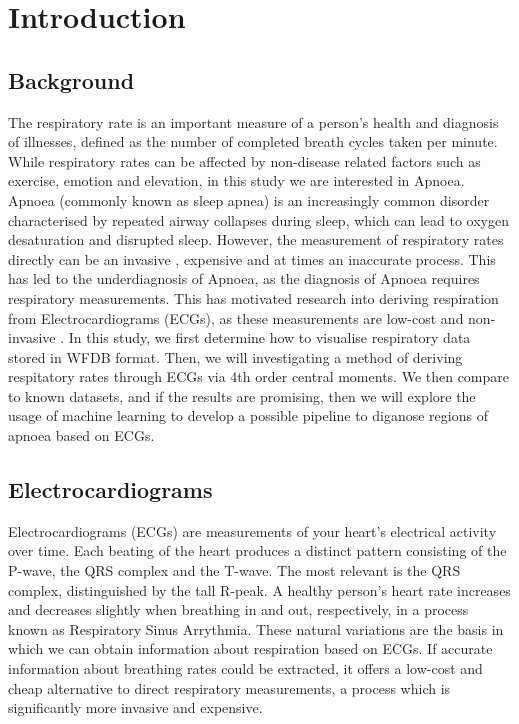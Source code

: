 \chapter{Introduction}\label{ch:introduction}

\section{Background}
The respiratory rate is an important measure of a person's health and diagnosis of illnesses, defined as the number of completed breath cycles taken per minute. \cite{associationUnderstandingVitalSigns}\cite{fanHighAccuracyUltraLow2022} While respiratory rates can be affected by non-disease related factors such as exercise, emotion and elevation, in this study we are interested in Apnoea. Apnoea (commonly known as sleep apnea) is an increasingly common disorder characterised by repeated airway collapses during sleep, which can lead to oxygen desaturation and disrupted sleep. 
\cite{jordanAdultObstructiveSleep2014a} However, the measurement of respiratory rates directly can be an invasive , expensive and at times an inaccurate process. 
This has led to the underdiagnosis of Apnoea, as the diagnosis of Apnoea requires respiratory measurements. 
\nl
This has motivated research into deriving respiration from Electrocardiograms (ECGs), as these measurements are low-cost and non-invasive \cite{fanHighAccuracyUltraLow2022}. \nl
In this study, we first determine how to visualise respiratory data stored in WFDB format. Then, we will investigating a method of deriving respitatory rates through ECGs via 4th order central moments. We then compare to known datasets, and if the results are promising, then we will explore the usage of machine learning to develop a possible pipeline to diganose regions of apnoea based on ECGs.

\section{Electrocardiograms}
Electrocardiograms (ECGs) are measurements of your heart's electrical activity over time. Each beating of the heart produces a distinct pattern consisting of the P-wave, the QRS complex and the T-wave. The most relevant is the QRS complex, distinguished by the tall R-peak. \nl
A healthy person's heart rate increases and decreases slightly when breathing in and out, respectively, in a process known as Respiratory Sinus Arrythmia. These natural variations are the basis in which we can obtain information about respiration based on ECGs. If accurate information about breathing rates could be extracted, it offers a low-cost and cheap alternative to direct respiratory measurements, a process which is significantly more invasive and expensive.

